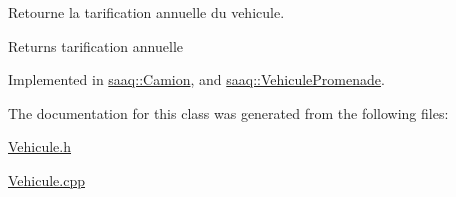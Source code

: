 Retourne la tarification annuelle du vehicule. 

\begin{DoxyReturn}{Returns}
tarification annuelle 
\end{DoxyReturn}


Implemented in \hyperlink{classsaaq_1_1Camion_af01bdc48db3cdeb3bc29c8b864ffdad8}{saaq\+::\+Camion}, and \hyperlink{classsaaq_1_1VehiculePromenade_ad94d645be9862d1cd86953ca8a7777b9}{saaq\+::\+Vehicule\+Promenade}.



The documentation for this class was generated from the following files\+:\begin{DoxyCompactItemize}
\item 
\hyperlink{Vehicule_8h}{Vehicule.\+h}\item 
\hyperlink{Vehicule_8cpp}{Vehicule.\+cpp}\end{DoxyCompactItemize}
